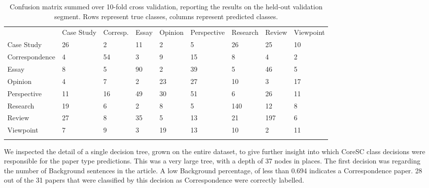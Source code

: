 \documentclass{svmult}
\begin{document}
\begin{table}

\vspace{-10pt}

\caption{Confusion matrix summed over 10-fold cross validation, reporting the results on the held-out validation segment. Rows represent true classes, columns represent predicted classes.}
\label{tab:confusion}       %

\begin{tabular}{lllllllll}
\hline\noalign{\smallskip}
      &  Case Study   &     Corresp.      &   Essay  & Opinion &     Perspective    &     Research    &     Review  & Viewpoint \\
\noalign{\smallskip}\svhline\noalign{\smallskip}
Case Study    &    26   &     2     &   11    &    2  &      5 & 26       & 25 &       10 \\
Correspondence  &      4  &      54   &     3    &    9     &   15 & 8   &     4 &       2 \\
Essay      &  8     &   5    &   90    &    2 &       39      &  5 & 46    &    5 \\
Opinion    &    4   &     7 &       2   &     23      &  27     &   10   &  3  &      17 \\
Perspective &       11  &      16    &    49       & 30      &  51 & 6      &  26    &   11 \\
Research      &  19    &    6 &       2 &       8    &    5      &  140  &   12    &    8\\
Review       & 27     &   8     &   35    &    5      &  13    &    21   &  197 &       6\\
Viewpoint    &    7  &      9   &     3     &   19     &   13 & 10     &   2  &      11 \\
\noalign{\smallskip}\hline\noalign{\smallskip}
\end{tabular}
\vspace{-15pt}
\end{table}




We inspected the detail of a single decision tree, grown on the entire dataset,
to give further insight into which CoreSC class decisions were responsible for
the paper type predictions. This was a very large tree, with a depth of 37
nodes in places.  The first decision was regarding the number of Background
sentences in the article. A low Background percentage, of less than 0.694
indicates a Correspondence paper. 28 out of the 31 papers that were classified
by this decision as Correspondence were correctly labelled. 
\end{document}
